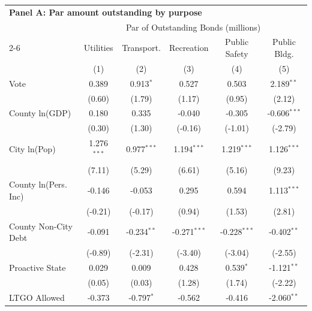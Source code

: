 \begingroup
\centering
\begin{tabular*}{\textwidth}{@{\extracolsep{\fill}}lccccc}
\multicolumn{6}{l}{\textbf{Panel A: Par amount outstanding by purpose}}\\

\addlinespace
   \toprule
    & \multicolumn{5}{c}{Par of Outstanding Bonds (millions)}\\
   \cmidrule(lr){2-6}
                        & Utilities     & Transport.     & Recreation     & Public Safety  & Public Bldg. \\   
                        & (1)           & (2)            & (3)            & (4)            & (5)\\  
   \midrule 
   Vote                 & 0.389         & 0.913$^{*}$    & 0.527          & 0.503          & 2.189$^{**}$\\   
                        & (0.60)       & (1.79)        & (1.17)        & (0.95)        & (2.12)\\   
   County ln(GDP)       & 0.180         & 0.335          & -0.040         & -0.305         & -0.606$^{***}$\\   
                        & (0.30)       & (1.30)        & (-0.16)       & (-1.01)       & (-2.79)\\   
   City ln(Pop)         & 1.276$^{***}$ & 0.977$^{***}$  & 1.194$^{***}$  & 1.219$^{***}$  & 1.126$^{***}$\\   
                        & (7.11)       & (5.29)        & (6.61)        & (5.16)        & (9.23)\\   
   County ln(Pers. Inc) & -0.146        & -0.053         & 0.295          & 0.594          & 1.113$^{***}$\\   
                        & (-0.21)      & (-0.17)       & (0.94)        & (1.53)        & (2.81)\\   
   County Non-City Debt & -0.091        & -0.234$^{**}$  & -0.271$^{***}$ & -0.228$^{***}$ & -0.402$^{**}$\\   
                        & (-0.89)      & (-2.31)       & (-3.40)       & (-3.04)       & (-2.55)\\   
   Proactive State      & 0.029         & 0.009          & 0.428          & 0.539$^{*}$    & -1.121$^{**}$\\   
                        & (0.05)       & (0.03)        & (1.28)        & (1.74)        & (-2.22)\\   
   LTGO Allowed         & -0.373        & -0.797$^{*}$   & -0.562         & -0.416         & -2.060$^{**}$\\   

\end{tabular*}
